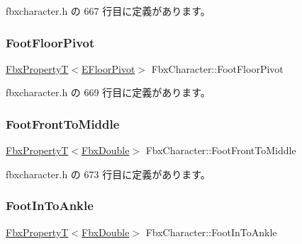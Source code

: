  fbxcharacter.\+h の 667 行目に定義があります。

\mbox{\label{class_fbx_character_aad2d02ce3b5dfbc7767cdf36267eb8e4}} 
\subsubsection{\texorpdfstring{Foot\+Floor\+Pivot}{FootFloorPivot}}
{\footnotesize\ttfamily \hyperlink{class_fbx_property_t}{Fbx\+PropertyT}$<$\hyperlink{class_fbx_character_a565c1e424493adecfa38e0dcdd17106e}{E\+Floor\+Pivot}$>$ Fbx\+Character\+::\+Foot\+Floor\+Pivot}



 fbxcharacter.\+h の 669 行目に定義があります。

\mbox{\label{class_fbx_character_a55c8827292a678cf53725d50d594f2ed}} 
\subsubsection{\texorpdfstring{Foot\+Front\+To\+Middle}{FootFrontToMiddle}}
{\footnotesize\ttfamily \hyperlink{class_fbx_property_t}{Fbx\+PropertyT}$<$\hyperlink{fbxtypes_8h_a171e72a1c46fc15c1a6c9c31948c1c5b}{Fbx\+Double}$>$ Fbx\+Character\+::\+Foot\+Front\+To\+Middle}



 fbxcharacter.\+h の 673 行目に定義があります。

\mbox{\label{class_fbx_character_afcae422eca3e15efe65c5797a78fbf93}} 
\subsubsection{\texorpdfstring{Foot\+In\+To\+Ankle}{FootInToAnkle}}
{\footnotesize\ttfamily \hyperlink{class_fbx_property_t}{Fbx\+PropertyT}$<$\hyperlink{fbxtypes_8h_a171e72a1c46fc15c1a6c9c31948c1c5b}{Fbx\+Double}$>$ Fbx\+Character\+::\+Foot\+In\+To\+Ankle}



